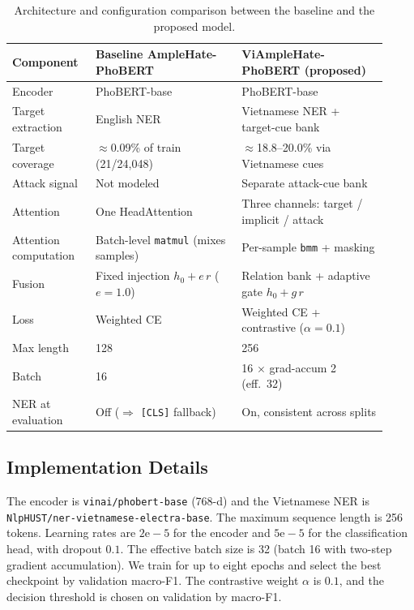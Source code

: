 \documentclass[11pt]{article}
\begin{document}
\begin{table}[t]
  \centering
  \small
  \begin{tabular}{p{0.20\linewidth} p{0.36\linewidth} p{0.36\linewidth}}
    \toprule
    \textbf{Component} & \textbf{Baseline AmpleHate-PhoBERT} & \textbf{ViAmpleHate-PhoBERT (proposed)} \\
    \midrule
    Encoder & PhoBERT-base & PhoBERT-base \\
    Target extraction & English NER & Vietnamese NER + target-cue bank \\
    Target coverage & $\approx$0.09\% of train (21/24{,}048) & $\approx$18.8--20.0\% via Vietnamese cues \\
    Attack signal & Not modeled & Separate attack-cue bank \\
    Attention & One HeadAttention & Three channels: target / implicit / attack \\
    Attention computation & Batch-level \texttt{matmul} (mixes samples) & Per-sample \texttt{bmm} + masking \\
    Fusion & Fixed injection $h_0+e\,r$ ($e{=}1.0$) & Relation bank + adaptive gate $h_0+g\,r$ \\
    Loss & Weighted CE & Weighted CE + contrastive ($\alpha{=}0.1$) \\
    Max length & 128 & 256 \\
    Batch & 16 & 16 $\times$ grad-accum 2 (eff.\ 32) \\
    NER at evaluation & Off ($\Rightarrow$ \texttt{[CLS]} fallback) & On, consistent across splits \\
    \bottomrule
  \end{tabular}
  \caption{Architecture and configuration comparison between the baseline and the proposed model.}
  \label{tab:arch}
\end{table}

\subsection{Implementation Details}
The encoder is \texttt{vinai/phobert-base} (768-d) and the Vietnamese NER is \texttt{NlpHUST/ner-vietnamese-electra-base}. The maximum sequence length is 256 tokens. Learning rates are $2\mathrm{e}{-}5$ for the encoder and $5\mathrm{e}{-}5$ for the classification head, with dropout $0.1$. The effective batch size is 32 (batch 16 with two-step gradient accumulation). We train for up to eight epochs and select the best checkpoint by validation macro-F1. The contrastive weight $\alpha$ is $0.1$, and the decision threshold is chosen on validation by macro-F1.
\end{document}
